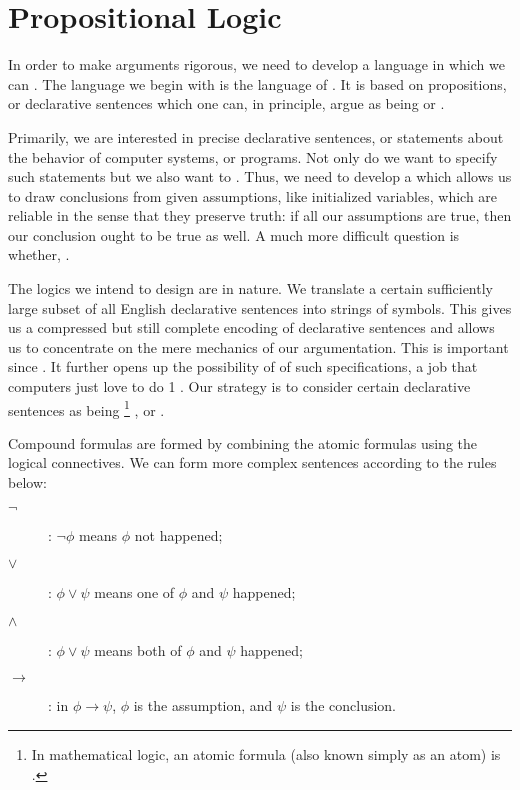 \section{Propositional Logic}

In order to make arguments rigorous, we need to develop a language in which we can . 
The language we begin with is the language of . 
It is based on propositions, or declarative sentences which one can, in principle, argue as being  or .

Primarily, we are interested in precise declarative sentences, or statements about the behavior of computer systems, or programs. 
Not only do we want to specify such statements but we also want to . 
Thus, we need to develop a  which allows us to draw conclusions from given assumptions, like initialized variables, which are reliable in the sense that they preserve truth: if all our assumptions are true, then our conclusion ought to be true as well. 
A much more diﬃcult question is whether, .

The logics we intend to design are  in nature. 
We translate a certain suﬃciently large subset of all English declarative sentences into strings of symbols. 
This gives us a compressed but still complete encoding of declarative sentences and allows us to concentrate on the mere mechanics of our argumentation. 
This is important since . 
It further opens up the possibility of  of such speciﬁcations, a job that computers just love to do 1 . 
Our strategy is to consider certain declarative sentences as being 
\footnote{In mathematical logic, an atomic formula (also known simply as an atom) is .} , or .

Compound formulas are formed by combining the atomic formulas using the logical connectives. 
We can form more complex sentences according to the rules below:
\begin{description}
  \item[$\neg$]: $\neg \phi$ means $\phi$ not happened;
  \item[$\vee$]: $\phi \vee \psi$ means one of $\phi$ and $\psi$ happened;
  \item[$\wedge$]: $\phi \vee \psi$ means both of $\phi$ and $\psi$ happened;
  \item[$\to$]: in $\phi \to \psi$, $\phi$ is the assumption, and $\psi$ is the conclusion.
\end{description}

